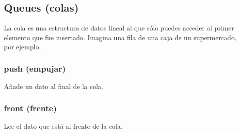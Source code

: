 \documentclass[letterpaper,10pt,spanish]{sphinxmanual}
\begin{document}
\subsection{Queues (colas)}
\label{\detokenize{edd/lineales:queues-colas}}
La cola es una estructura de datos lineal al que sólo puedes acceder al primer elemento que fue insertado. Imagina una fila de una caja de un supermercado, por ejemplo.

\begin{sphinxVerbatim}[commandchars=\\\{\},numbers=left,firstnumber=1,stepnumber=1]
        
\end{sphinxVerbatim}


\subsubsection{push (empujar)}
\label{\detokenize{edd/lineales:id1}}
Añade un dato al final de la cola.

\begin{sphinxVerbatim}[commandchars=\\\{\},numbers=left,firstnumber=1,stepnumber=1]
\end{sphinxVerbatim}


\subsubsection{front (frente)}
\label{\detokenize{edd/lineales:front-frente}}
Lee el dato que está al frente de la cola.

\begin{sphinxVerbatim}[commandchars=\\\{\},numbers=left,firstnumber=1,stepnumber=1]
\end{sphinxVerbatim}
\end{document}
